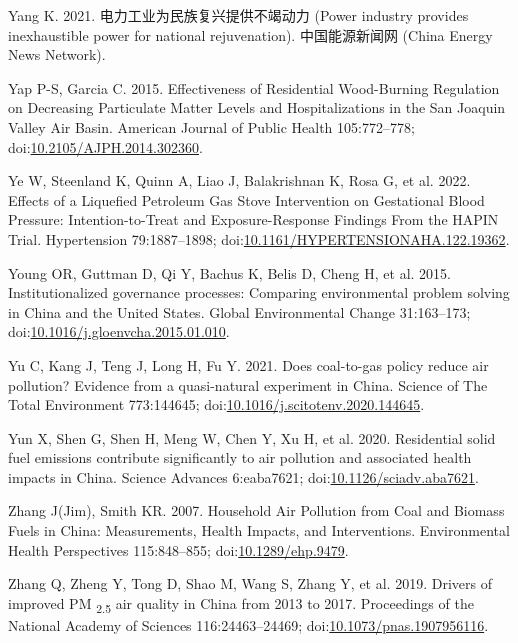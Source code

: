 \documentclass[
  letterpaper,
  DIV=11,
  numbers=noendperiod]{scrartcl}
\newlength{\cslhangindent}
\newenvironment{CSLReferences}[2] %
 {\begin{list}{}{%
  \setlength{\itemindent}{0pt}
  \setlength{\leftmargin}{0pt}
  \setlength{\parsep}{0pt}
  \ifodd #1
   \setlength{\leftmargin}{\cslhangindent}
   \setlength{\itemindent}{-1\cslhangindent}
  \fi
  \setlength{\itemsep}{#2\baselineskip}}}
 {\end{list}}
\begin{document}
\begin{CSLReferences}{1}{1}
Yang K. 2021. {电力工业为民族复兴提供不竭动力 (Power industry provides
inexhaustible power for national rejuvenation)}. 中国能源新闻网 (China
Energy News Network).

Yap P-S, Garcia C. 2015. Effectiveness of {Residential Wood-Burning
Regulation} on {Decreasing Particulate Matter Levels} and
{Hospitalizations} in the {San Joaquin Valley Air Basin}. American
Journal of Public Health 105:772--778;
doi:\href{https://doi.org/10.2105/AJPH.2014.302360}{10.2105/AJPH.2014.302360}.

Ye W, Steenland K, Quinn A, Liao J, Balakrishnan K, Rosa G, et al. 2022.
Effects of a {Liquefied Petroleum Gas Stove Intervention} on
{Gestational Blood Pressure}: {Intention-to-Treat} and
{Exposure-Response Findings From} the {HAPIN Trial}. Hypertension
79:1887--1898;
doi:\href{https://doi.org/10.1161/HYPERTENSIONAHA.122.19362}{10.1161/HYPERTENSIONAHA.122.19362}.

Young OR, Guttman D, Qi Y, Bachus K, Belis D, Cheng H, et al. 2015.
Institutionalized governance processes: {Comparing} environmental
problem solving in {China} and the {United States}. Global Environmental
Change 31:163--173;
doi:\href{https://doi.org/10.1016/j.gloenvcha.2015.01.010}{10.1016/j.gloenvcha.2015.01.010}.

Yu C, Kang J, Teng J, Long H, Fu Y. 2021. Does coal-to-gas policy reduce
air pollution? {Evidence} from a quasi-natural experiment in {China}.
Science of The Total Environment 773:144645;
doi:\href{https://doi.org/10.1016/j.scitotenv.2020.144645}{10.1016/j.scitotenv.2020.144645}.

Yun X, Shen G, Shen H, Meng W, Chen Y, Xu H, et al. 2020. Residential
solid fuel emissions contribute significantly to air pollution and
associated health impacts in {China}. Science Advances 6:eaba7621;
doi:\href{https://doi.org/10.1126/sciadv.aba7621}{10.1126/sciadv.aba7621}.

Zhang J(Jim), Smith KR. 2007. Household {Air Pollution} from {Coal} and
{Biomass Fuels} in {China}: {Measurements}, {Health Impacts}, and
{Interventions}. Environmental Health Perspectives 115:848--855;
doi:\href{https://doi.org/10.1289/ehp.9479}{10.1289/ehp.9479}.

Zhang Q, Zheng Y, Tong D, Shao M, Wang S, Zhang Y, et al. 2019. Drivers
of improved {PM} {\textsubscript{2.5}} air quality in {China} from 2013
to 2017. Proceedings of the National Academy of Sciences
116:24463--24469;
doi:\href{https://doi.org/10.1073/pnas.1907956116}{10.1073/pnas.1907956116}.


\end{CSLReferences}
\end{document}
